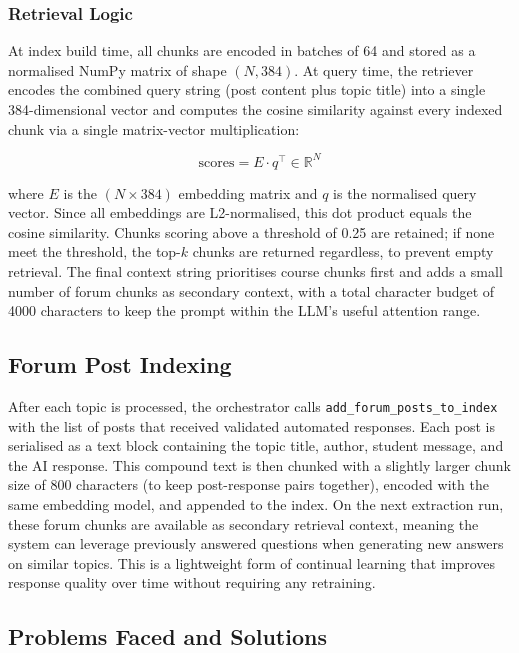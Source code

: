 \documentclass[12pt, a4paper]{article}
\begin{document}
\subsubsection{Retrieval Logic}

At index build time, all chunks are encoded in batches of 64 and stored as a normalised NumPy matrix of shape $(N, 384)$. At query time, the retriever encodes the combined query string (post content plus topic title) into a single 384-dimensional vector and computes the cosine similarity against every indexed chunk via a single matrix-vector multiplication:

\[
\text{scores} = E \cdot q^\top \in \mathbb{R}^N
\]

where $E$ is the $(N \times 384)$ embedding matrix and $q$ is the normalised query vector. Since all embeddings are L2-normalised, this dot product equals the cosine similarity. Chunks scoring above a threshold of 0.25 are retained; if none meet the threshold, the top-$k$ chunks are returned regardless, to prevent empty retrieval. The final context string prioritises course chunks first and adds a small number of forum chunks as secondary context, with a total character budget of 4000 characters to keep the prompt within the LLM's useful attention range.

\subsection{Forum Post Indexing}

After each topic is processed, the orchestrator calls \texttt{add\_forum\_posts\_to\_index} with the list of posts that received validated automated responses. Each post is serialised as a text block containing the topic title, author, student message, and the AI response. This compound text is then chunked with a slightly larger chunk size of 800 characters (to keep post-response pairs together), encoded with the same embedding model, and appended to the index. On the next extraction run, these forum chunks are available as secondary retrieval context, meaning the system can leverage previously answered questions when generating new answers on similar topics. This is a lightweight form of continual learning that improves response quality over time without requiring any retraining.

\subsection{Problems Faced and Solutions}
\end{document}
